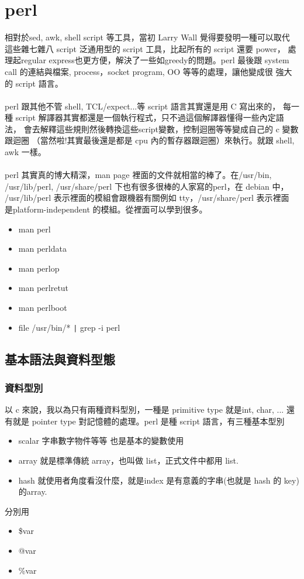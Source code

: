     \chapter{perl}
    相對於sed, awk, shell script 等工具，當初 Larry Wall 覺得要發明一種可以取代
    這些雜七雜八 script 泛通用型的 script 工具，比起所有的 script 還要 power，
    處理起regular express也更方便，解決了一些如greedy的問題。perl 最後跟
    system call 的連結與檔案, process，socket program, OO 等等的處理，讓他變成很
    強大的 script 語言。
    \\\\
    perl 跟其他不管 shell, TCL/expect...等 script 語言其實還是用 C 寫出來的，
    每一種 script 解譯器其實都還是一個執行程式，只不過這個解譯器懂得一些內定語法，
    會去解釋這些規則然後轉換這些script變數，控制迴圈等等變成自己的 c 變數跟迴圈
    （當然啦!其實最後還是都是 cpu 內的暫存器跟迴圈）來執行。就跟 shell, awk 一樣。
    \\\\
    perl 其實真的博大精深，man page 裡面的文件就相當的棒了。在/usr/bin, 
    /usr/lib/perl, /usr/share/perl 下也有很多很棒的人家寫的perl，在 debian 中，
    /usr/lib/perl 表示裡面的模組會跟機器有關例如 tty，/usr/share/perl 表示裡面
    是platform-independent 的模組。從裡面可以學到很多。
    \begin{itemize}
    \item man perl
    \item man perldata
    \item man perlop
    \item man perlretut
    \item man perlboot
    \item file /usr/bin/* \verb=|= grep -i perl
    \end{itemize}
    \section{基本語法與資料型態}
    \subsection{資料型別}
    以 c 來說，我以為只有兩種資料型別，一種是 primitive type 就是int, char, ...
    還有就是 pointer type 對記憶體的處理。perl 是種 script 語言，有三種基本型別
    \begin{itemize}
    \item scalar 字串數字物件等等 也是基本的變數使用
    \item array 就是標準傳統 array，也叫做 list，正式文件中都用 list.
    \item hash 就使用者角度看沒什麼，就是index 是有意義的字串(也就是 hash 的 key)
	  的array.
    \end{itemize}
    分別用
    \begin{itemize}
    \item \$var
    \item @var
    \item \%var
    \end{itemize}

